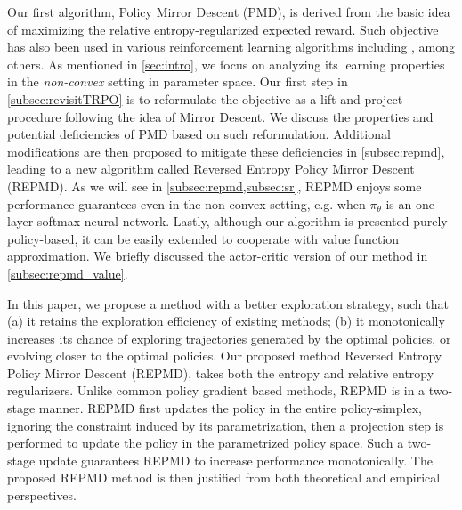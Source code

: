 Our first algorithm, Policy Mirror Descent (PMD), is derived from the basic idea of maximizing the relative entropy-regularized expected reward. Such objective has also been used in various reinforcement learning algorithms including \citet{williams1991function,fox2015taming,schulman2017equivalence,nachum2017bridging,haarnoja2017reinforcement}, among others.
As mentioned in \cref{sec:intro}, we focus on analyzing its learning properties in the \emph{non-convex} setting in parameter space.
Our first step in \cref{subsec:revisitTRPO} is to reformulate the 
objective as a lift-and-project procedure following the idea of Mirror Descent. 
We discuss the properties and potential deficiencies of PMD based on such reformulation.
Additional modifications are then proposed  to mitigate these deficiencies in \cref{subsec:repmd}, leading to a new algorithm called Reversed Entropy Policy Mirror Descent (REPMD).
As we will see in \cref{subsec:repmd,subsec:sr}, REPMD enjoys some performance guarantees even in the non-convex setting, e.g. when $\pi_\theta$ is an one-layer-softmax neural network. 
Lastly, although our algorithm is presented purely policy-based, it can be easily extended to cooperate with value function approximation. 
We briefly discussed the actor-critic version of our method in \cref{subsec:repmd_value}.





In this paper, we propose a method with a better exploration strategy, such that (a) it retains the exploration efficiency of existing methods; (b) it monotonically increases its chance of exploring trajectories generated by the optimal policies, or evolving closer to the optimal policies. Our proposed method Reversed Entropy Policy Mirror Descent (REPMD), takes both the entropy and relative entropy regularizers. Unlike common policy gradient based methods, REPMD is in a two-stage manner.  REPMD first updates the policy in the entire policy-simplex, ignoring the constraint induced by its parametrization, then a projection step is performed to update the policy in the parametrized policy space. Such a two-stage update guarantees REPMD to increase performance monotonically. The proposed REPMD method is then justified from both theoretical and empirical perspectives.


